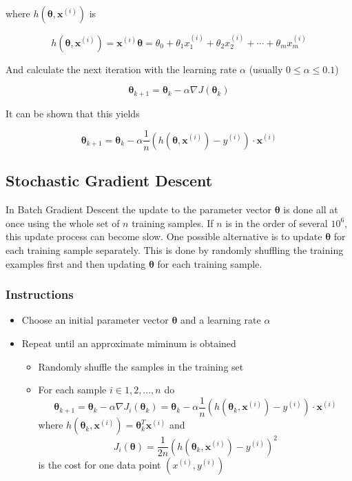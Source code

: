 \documentclass[a4paper, 11pt]{article}
\begin{document}
where $h(\bm{\theta},\textbf{x}^{(i)})$ is

\begin{equation}
h(\bm{\theta},\bm{x}^{(i)}) = \bm{x}^{(i)}\bm{\theta} = \theta_0 + \theta_1 x^{(i)}_1 + \theta_2 x^{(i)}_2 + \cdots + \theta_m x^{(i)}_m
\end{equation}

And calculate the next iteration with the learning rate $\alpha$ (usually $0\leq\alpha\leq0.1$)

\begin{equation}
	\bm{\theta}_{k+1} = \bm{\theta}_{k} -\alpha\nabla J(\bm{\theta}_k)
\end{equation}

It can be shown that this yields

\begin{equation}
    \bm{\theta}_{k+1} = \bm{\theta}_{k} -\alpha\frac{1}{n}(h(\bm{\theta},\bm{x}^{(i)})-y^{(i)})\cdot\bm{x}^{(i)}
\end{equation}

\subsection{Stochastic Gradient Descent}
In Batch Gradient Descent the update to the parameter vector $\bm{\theta}$ is done all at once using the whole set of $n$ training samples. If $n$ is in the order of several $10^6$, this update process can become slow. One possible alternative is to update $\bm{\theta}$ for each training sample separately. This is done by randomly shuffling the training examples first and then updating $\bm{\theta}$ for each training sample.

\subsubsection{Instructions}
\begin{itemize}
    \item Choose an initial parameter vector $\bm{\theta}$ and a learning rate $\alpha$
    \item Repeat until an approximate miminum is obtained
        \begin{itemize}
            \item Randomly shuffle the samples in the training set
            \item For each sample $i \in {1,2,...,n}$ do
                \begin{equation*}
                    \bm{\theta}_{k+1} = \bm{\theta}_{k} -\alpha\nabla J_i(\bm{\theta}_k) = \bm{\theta}_{k} -\alpha\frac{1}{n}(h(\bm{\theta}_k,\bm{x}^{(i)})-y^{(i)})\cdot\bm{x}^{(i)}
                \end{equation*}
                where $h(\bm{\theta}_k,\bm{x}^{(i)})=\bm{\theta}_k^T \bm{x}^{(i)}$ and
                \begin{equation*}
                    J_i(\bm{\theta}) = \frac{1}{2n}(h(\bm{\theta}_k,\bm{x}^{(i)})-y^{(i)})^2
                \end{equation*}
                is the cost for one data point $(x^{(i)},y^{(i)})$
        \end{itemize}
\end{itemize}
\end{document}
